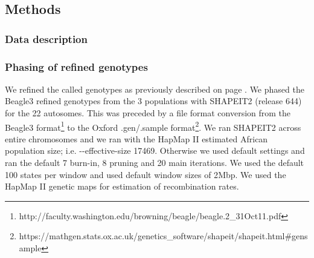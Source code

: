 \subsection{Methods}

\subsubsection{Data description}

\subsubsection{Phasing of refined genotypes}
We refined the called genotypes as previously described on page \pageref{par:agvrefinement}.
We phased the Beagle3 refined genotypes from the 3 populations with SHAPEIT2\cite{Delaneau2012} (release 644) for the 22 autosomes. This was preceded by a file format conversion from the Beagle3 format\footnote{http://faculty.washington.edu/browning/beagle/beagle.2\_31Oct11.pdf} to the Oxford .gen/.sample format\footnote{https://mathgen.stats.ox.ac.uk/genetics\_software/shapeit/shapeit.html\#gensample}. We ran SHAPEIT2 across entire chromosomes and we ran with the HapMap II\cite{hapmap2007} estimated African population size\cite{Wright01031931}\cite{Wright1938}; i.e. -{}-effective-size 17469. Otherwise we used default settings and ran the default 7 burn-in, 8 pruning and 20 main iterations. We used the default 100 states per window and used default window sizes of 2\gls{Mbp}. We used the HapMap II genetic maps for estimation of recombination rates.

